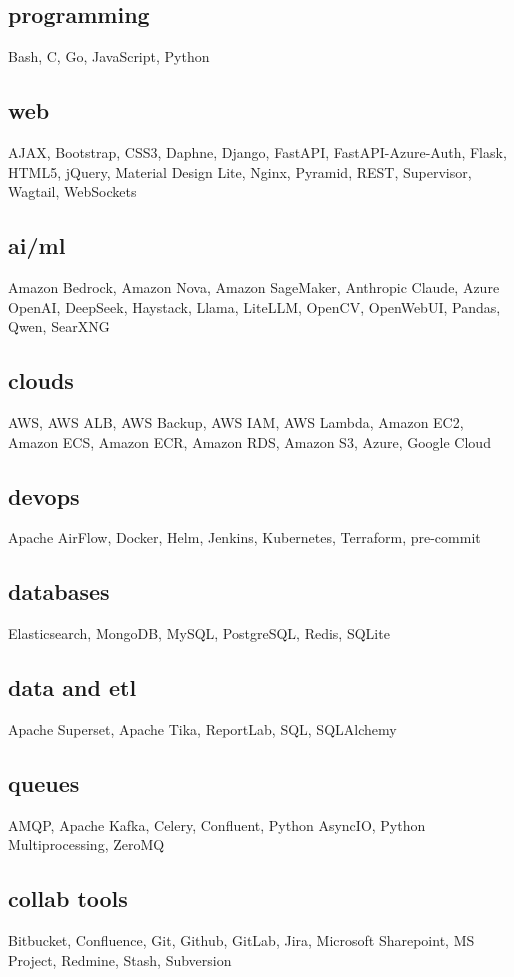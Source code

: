 \subsection{programming}
Bash, C, Go, JavaScript, Python%

\subsection{web}
AJAX, Bootstrap, CSS3, Daphne, Django, FastAPI, FastAPI-Azure-Auth, Flask, HTML5, jQuery, Material Design Lite, Nginx, Pyramid, REST, Supervisor, Wagtail, WebSockets%

\subsection{ai/ml}
Amazon Bedrock, Amazon Nova, Amazon SageMaker, Anthropic Claude, Azure OpenAI, DeepSeek, Haystack, Llama, LiteLLM, OpenCV, OpenWebUI, Pandas, Qwen, SearXNG%

\subsection{clouds}
AWS, AWS ALB, AWS Backup, AWS IAM, AWS Lambda, Amazon EC2, Amazon ECS, Amazon ECR, Amazon RDS, Amazon S3, Azure, Google Cloud%

\subsection{devops}
Apache AirFlow, Docker, Helm, Jenkins, Kubernetes, Terraform, pre-commit%

\subsection{databases}
Elasticsearch, MongoDB, MySQL, PostgreSQL, Redis, SQLite%

\subsection{data and etl}
Apache Superset, Apache Tika, ReportLab, SQL, SQLAlchemy%

\subsection{queues}
AMQP, Apache Kafka, Celery, Confluent, Python AsyncIO, Python Multiprocessing, ZeroMQ%

\subsection{collab tools}
Bitbucket, Confluence, Git, Github, GitLab, Jira, Microsoft Sharepoint, MS Project, Redmine, Stash, Subversion%

